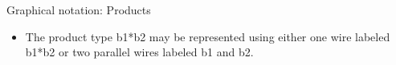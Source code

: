 \documentclass[11pt]{beamer}
\begin{document}
\begin{frame}{Graphical notation: Products} 

\begin{itemize}
\item The product type {{b1*b2}} may be represented using either one wire labeled
{{b1*b2}} or two parallel wires labeled {{b1}} and {{b2}}. 
\end{itemize}

\begin{multicols}{2}
\begin{center}
\end{center}
\begin{center}
\end{center}
\end{multicols}
\vfill
\begin{multicols}{2}
\begin{center}
\end{center}
\begin{center}
\end{center}
\end{multicols}
\end{frame}
\end{document}
